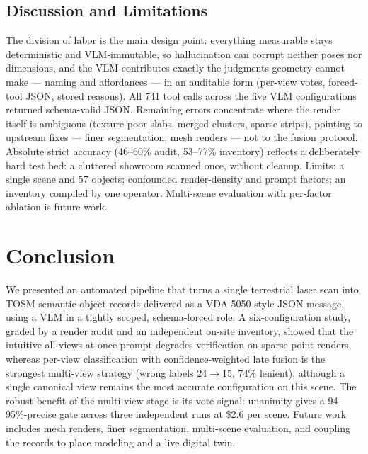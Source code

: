 \documentclass[conference]{IEEEtran}
\begin{document}
\subsection{Discussion and Limitations}
The division of labor is the main design point: everything measurable stays
deterministic and VLM-immutable, so hallucination can corrupt neither poses
nor dimensions, and the VLM contributes exactly the judgments geometry
cannot make --- naming and affordances --- in an auditable form (per-view
votes, forced-tool JSON, stored reasons). All 741 tool calls across the
five VLM configurations returned schema-valid JSON. Remaining errors
concentrate where the render itself is ambiguous (texture-poor slabs,
merged clusters, sparse strips), pointing to upstream fixes --- finer
segmentation, mesh renders --- not to the fusion protocol. Absolute strict
accuracy (46--60\% audit, 53--77\% inventory) reflects a deliberately
hard test bed: a cluttered showroom scanned once, without cleanup. Limits:
a single scene and 57 objects; confounded render-density and prompt
factors; an inventory compiled by one operator. Multi-scene evaluation
with per-factor ablation is future work.

\section{Conclusion}
We presented an automated pipeline that turns a single terrestrial laser
scan into TOSM semantic-object records delivered as a VDA 5050-style JSON
message, using a VLM in a tightly scoped, schema-forced role. A
six-configuration study, graded by a render audit and an independent
on-site inventory, showed that the intuitive all-views-at-once prompt
degrades verification on sparse point renders, whereas per-view
classification with confidence-weighted late fusion is the strongest
multi-view strategy (wrong labels 24$\rightarrow$15, 74\% lenient),
although a single canonical view remains the most accurate configuration
on this scene. The robust benefit of the multi-view stage is its vote
signal: unanimity gives a 94--95\%-precise gate across three independent
runs at \$2.6 per scene. Future work includes mesh renders, finer
segmentation, multi-scene evaluation, and coupling the records to place
modeling and a live digital twin.
\end{document}

